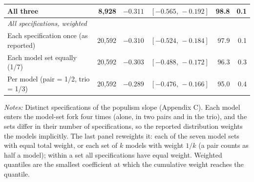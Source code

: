 \begin{table}[ht]
{\begin{tabular}{lrrcrr}
\quad All three & 8,928 & $-0.311$ & $[-0.565,\,-0.192]$ & 98.8 & 0.1 \\
\midrule
\multicolumn{6}{l}{\textit{All specifications, weighted}} \\
\quad Each specification once (as reported) & 20,592 & $-0.310$ & $[-0.524,\,-0.184]$ & 97.9 & 0.1 \\
\quad Each model set equally (1/7) & 20,592 & $-0.303$ & $[-0.488,\,-0.172]$ & 96.3 & 0.3 \\
\quad Per model (pair = 1/2, trio = 1/3) & 20,592 & $-0.289$ & $[-0.476,\,-0.166]$ & 95.0 & 0.4 \\
\bottomrule
\end{tabular}
}
\begin{minipage}{0.95\linewidth}\scriptsize\vspace{0.5ex}
\textit{Notes:} Distinct specifications of the populism slope (Appendix C). Each model enters the model-set fork four times (alone, in two pairs and in the trio), and the sets differ in their number of specifications, so the reported distribution weights the models implicitly. The last panel reweights it: each of the seven model sets with equal total weight, or each set of $k$ models with weight $1/k$ (a pair counts as half a model); within a set all specifications have equal weight. Weighted quantiles are the smallest coefficient at which the cumulative weight reaches the quantile.
\end{minipage}
\end{table}
